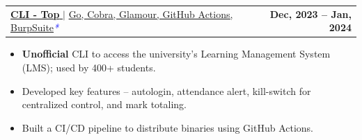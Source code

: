 \documentclass[letterpaper,11pt]{article}
\makeatletter
\newcommand{\uniformunderline}[1]{%
  \uline{\phantom{#1}}%
  \llap{\contour{white}{#1}}%
}
\newcommand{\resumeItem}[1]{
  \item\small{
    {#1 \vspace{-1pt}}
  }
}
\newcommand{\resumeProjectHeading}[2]{
    \item
    \begin{tabular*}{1.001\textwidth}{l@{\extracolsep{\fill}}r}
      \small#1 & \textbf{\small #2}\\
    \end{tabular*}\vspace{-7pt}
}
\newcommand{\resumeItemListStart}{\begin{itemize}}
\newcommand{\resumeItemListEnd}{\end{itemize}\vspace{-5pt}}
\makeatother
\begin{document}
        \resumeProjectHeading
            {\href{https://cli-top.acmvit.in}{\textbf{\large{CLI - Top}} \href{https://cli-top.acmvit.in}{\footnotesize{\raisebox{-0.1\height}\faExternalLink}}} $|$ \normalsize{\href{https://github.com/ACM-VIT/cli-top}{Go, Cobra, Glamour, GitHub Actions, BurpSuite}}\textcolor{blue}{\small{\textit{*}}}}{Dec, 2023 -- Jan, 2024}
            \vspace{-11pt}
            \resumeItemListStart
                \resumeItem{\normalsize{\textbf{Unofficial} CLI to access the university's Learning Management System (LMS); used by 400+ students.}} 
                \resumeItem{\normalsize{Developed key features -- autologin, attendance alert, kill-switch for centralized control, and mark totaling.}}
                \resumeItem{\normalsize{Built a CI/CD pipeline to distribute binaries using GitHub Actions.}}
            \resumeItemListEnd
            \vspace{-12.5pt}
      

\end{document}

